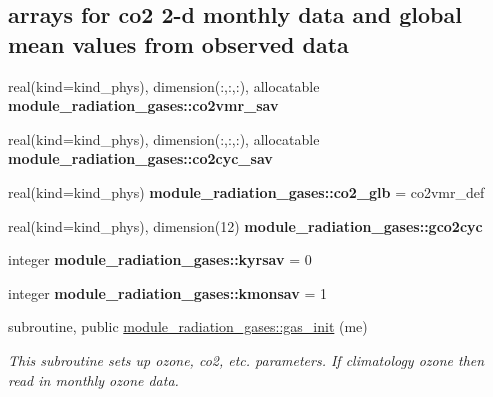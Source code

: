 \subsection*{arrays for co2 2-\/d monthly data and global mean values from observed data}
\begin{DoxyCompactItemize}
\item 
\mbox{\label{group__module__radiation__gases_ga4f35e5db780a64963dc65b8449def39d}} 
real(kind=kind\+\_\+phys), dimension(\+:,\+:,\+:), allocatable {\bfseries module\+\_\+radiation\+\_\+gases\+::co2vmr\+\_\+sav}
\item 
\mbox{\label{group__module__radiation__gases_ga3985e306e5555089909fd42a4cc93afb}} 
real(kind=kind\+\_\+phys), dimension(\+:,\+:,\+:), allocatable {\bfseries module\+\_\+radiation\+\_\+gases\+::co2cyc\+\_\+sav}
\item 
\mbox{\label{group__module__radiation__gases_ga0398d6837c9e8c41359e76a754147002}} 
real(kind=kind\+\_\+phys) {\bfseries module\+\_\+radiation\+\_\+gases\+::co2\+\_\+glb} = co2vmr\+\_\+def
\item 
\mbox{\label{group__module__radiation__gases_gac2a03ad96c9aa598f9751fd689cb615f}} 
real(kind=kind\+\_\+phys), dimension(12) {\bfseries module\+\_\+radiation\+\_\+gases\+::gco2cyc}
\item 
\mbox{\label{group__module__radiation__gases_ga6b4372e633bef3fb367e6ff3cf200bb8}} 
integer {\bfseries module\+\_\+radiation\+\_\+gases\+::kyrsav} = 0
\item 
\mbox{\label{group__module__radiation__gases_gab1cf1b63398a3e7ec0334a7c97258b4d}} 
integer {\bfseries module\+\_\+radiation\+\_\+gases\+::kmonsav} = 1
\item 
subroutine, public \hyperlink{group__module__radiation__gases_gaeff1c60060c81d3f0693a542976ee3db}{module\+\_\+radiation\+\_\+gases\+::gas\+\_\+init} (me)
\begin{DoxyCompactList}\small\item\em This subroutine sets up ozone, co2, etc. parameters. If climatology ozone then read in monthly ozone data. \end{DoxyCompactList}\item 

\end{DoxyCompactItemize}

